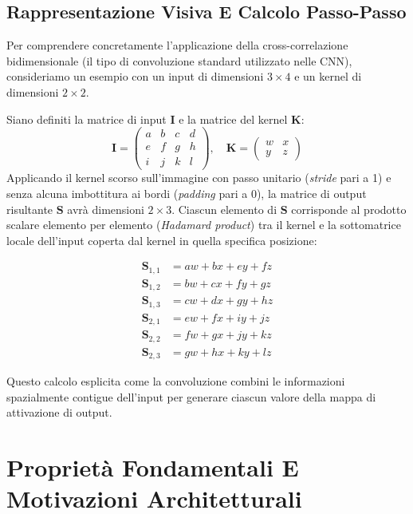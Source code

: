 ﻿\documentclass[11pt, a4paper]{article}
\begin{document}
\subsection{Rappresentazione Visiva E Calcolo Passo-Passo}

Per comprendere concretamente l'applicazione della cross-correlazione bidimensionale (il tipo di convoluzione standard utilizzato nelle CNN), consideriamo un esempio con un input di dimensioni $3 \times 4$ e un kernel di dimensioni $2 \times 2$.


Siano definiti la matrice di input $\bm{I}$ e la matrice del kernel $\bm{K}$:
\[
\bm{I} = \begin{pmatrix}
a & b & c & d \\
e & f & g & h \\
i & j & k & l
\end{pmatrix}, \quad
\bm{K} = \begin{pmatrix}
w & x \\
y & z
\end{pmatrix}
\]
Applicando il kernel scorso sull'immagine con passo unitario (\emph{stride} pari a 1) e senza alcuna imbottitura ai bordi (\emph{padding} pari a 0), la matrice di output risultante $\bm{S}$ avrà dimensioni $2 \times 3$. Ciascun elemento di $\bm{S}$ corrisponde al prodotto scalare elemento per elemento (\emph{Hadamard product}) tra il kernel e la sottomatrice locale dell'input coperta dal kernel in quella specifica posizione:

\begin{align*}
\bm{S}_{1,1} &= aw + bx + ey + fz \\
\bm{S}_{1,2} &= bw + cx + fy + gz \\
\bm{S}_{1,3} &= cw + dx + gy + hz \\
\bm{S}_{2,1} &= ew + fx + iy + jz \\
\bm{S}_{2,2} &= fw + gx + jy + kz \\
\bm{S}_{2,3} &= gw + hx + ky + lz
\end{align*}

Questo calcolo esplicita come la convoluzione combini le informazioni spazialmente contigue dell'input per generare ciascun valore della mappa di attivazione di output.

\newpage

\section{Proprietà Fondamentali E Motivazioni Architetturali}
\end{document}
